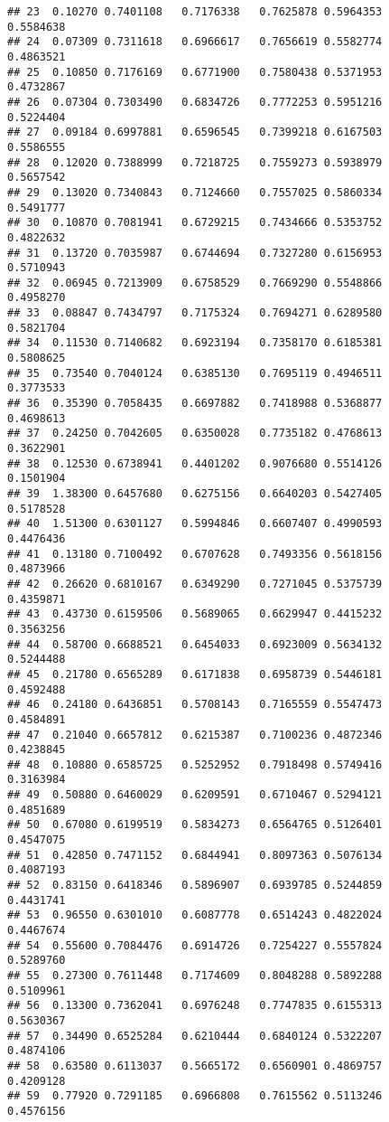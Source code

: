 \documentclass[]{article}
\begin{document}
\begin{verbatim}
## 23  0.10270 0.7401108   0.7176338   0.7625878 0.5964353    0.5584638
## 24  0.07309 0.7311618   0.6966617   0.7656619 0.5582774    0.4863521
## 25  0.10850 0.7176169   0.6771900   0.7580438 0.5371953    0.4732867
## 26  0.07304 0.7303490   0.6834726   0.7772253 0.5951216    0.5224404
## 27  0.09184 0.6997881   0.6596545   0.7399218 0.6167503    0.5586555
## 28  0.12020 0.7388999   0.7218725   0.7559273 0.5938979    0.5657542
## 29  0.13020 0.7340843   0.7124660   0.7557025 0.5860334    0.5491777
## 30  0.10870 0.7081941   0.6729215   0.7434666 0.5353752    0.4822632
## 31  0.13720 0.7035987   0.6744694   0.7327280 0.6156953    0.5710943
## 32  0.06945 0.7213909   0.6758529   0.7669290 0.5548866    0.4958270
## 33  0.08847 0.7434797   0.7175324   0.7694271 0.6289580    0.5821704
## 34  0.11530 0.7140682   0.6923194   0.7358170 0.6185381    0.5808625
## 35  0.73540 0.7040124   0.6385130   0.7695119 0.4946511    0.3773533
## 36  0.35390 0.7058435   0.6697882   0.7418988 0.5368877    0.4698613
## 37  0.24250 0.7042605   0.6350028   0.7735182 0.4768613    0.3622901
## 38  0.12530 0.6738941   0.4401202   0.9076680 0.5514126    0.1501904
## 39  1.38300 0.6457680   0.6275156   0.6640203 0.5427405    0.5178528
## 40  1.51300 0.6301127   0.5994846   0.6607407 0.4990593    0.4476436
## 41  0.13180 0.7100492   0.6707628   0.7493356 0.5618156    0.4873966
## 42  0.26620 0.6810167   0.6349290   0.7271045 0.5375739    0.4359871
## 43  0.43730 0.6159506   0.5689065   0.6629947 0.4415232    0.3563256
## 44  0.58700 0.6688521   0.6454033   0.6923009 0.5634132    0.5244488
## 45  0.21780 0.6565289   0.6171838   0.6958739 0.5446181    0.4592488
## 46  0.24180 0.6436851   0.5708143   0.7165559 0.5547473    0.4584891
## 47  0.21040 0.6657812   0.6215387   0.7100236 0.4872346    0.4238845
## 48  0.10880 0.6585725   0.5252952   0.7918498 0.5749416    0.3163984
## 49  0.50880 0.6460029   0.6209591   0.6710467 0.5294121    0.4851689
## 50  0.67080 0.6199519   0.5834273   0.6564765 0.5126401    0.4547075
## 51  0.42850 0.7471152   0.6844941   0.8097363 0.5076134    0.4087193
## 52  0.83150 0.6418346   0.5896907   0.6939785 0.5244859    0.4431741
## 53  0.96550 0.6301010   0.6087778   0.6514243 0.4822024    0.4467674
## 54  0.55600 0.7084476   0.6914726   0.7254227 0.5557824    0.5289760
## 55  0.27300 0.7611448   0.7174609   0.8048288 0.5892288    0.5109961
## 56  0.13300 0.7362041   0.6976248   0.7747835 0.6155313    0.5630367
## 57  0.34490 0.6525284   0.6210444   0.6840124 0.5322207    0.4874106
## 58  0.63580 0.6113037   0.5665172   0.6560901 0.4869757    0.4209128
## 59  0.77920 0.7291185   0.6966808   0.7615562 0.5113246    0.4576156

\end{verbatim}
\end{document}

